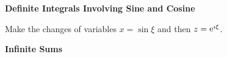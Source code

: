 {%
\begin{Hint}
  \label{hint 1/(a + b cos theta)^2}
\end{Hint}





\begin{Hint}
  \label{hint cos x / (e x + e -x)}
\end{Hint}







\begin{large}
  \noindent
  \textbf{Definite Integrals Involving Sine and Cosine}
\end{large}






\begin{Hint}
  \label{hint dq 1+sin2 q}
\end{Hint}





\begin{Hint}
  \label{hint 1/(2 + sin theta)}
\end{Hint}




\begin{Hint}
  \label{hint cos(n t)/(cos t - cos a)}
\end{Hint}






\begin{Hint}
  \label{hint x^2/((1+x^2)sqrt(1-x^2))}
  Make the changes of variables $x = \sin \xi$ and then $z = \mathop{\mathrm{e}}\nolimits^{\imath \xi}$.
\end{Hint}



\begin{large}
  \noindent
  \textbf{Infinite Sums}
\end{large}



}
